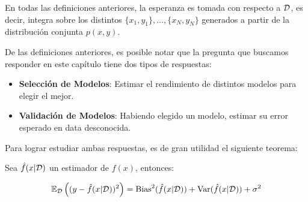\begin{remark}
	En todas las definiciones anteriores, la esperanza es tomada con respecto a ${\mathcal D}$, es decir, integra sobre los distintos $\{x_1,y_1\},\ldots,\{x_N,y_N\}$ generados a partir de la distribución conjunta $p(x,y)$.
\end{remark}

De las definiciones anteriores, es posible notar que la pregunta que buscamos responder en este capítulo tiene dos tipos de respuestas: 
\begin{itemize}
    \item \textbf{Selección de Modelos}: Estimar el rendimiento de distintos modelos para elegir el mejor.
    \item \textbf{Validación de Modelos}: Habiendo elegido un modelo, estimar su error esperado en data desconocida. 
\end{itemize}

Para lograr estudiar ambas respuestas, es de gran utilidad el siguiente teorema:

\begin{theorem} Sea $\hat{f}(x|{\mathcal D})$ un estimador de $f(x)$, entonces:

\begin{equation}
	\operatorname{\mathbb{E}}_{\mathcal D}\left((y-\hat{f}(x|{\mathcal D}))^2\right) = \text{Bias}^2(\hat{f}(x|{\mathcal D})) + \text{Var}(\hat{f}(x|{\mathcal D})) + \sigma^2
\end{equation}
	
\end{theorem}

